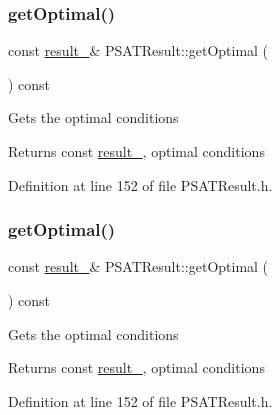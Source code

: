 \subsubsection{\texorpdfstring{get\+Optimal()}{getOptimal()}\hspace{0.1cm}{\footnotesize\ttfamily [1/3]}}
{\footnotesize\ttfamily const \hyperlink{struct_p_s_a_t_result_1_1result__}{result\+\_\+}\& P\+S\+A\+T\+Result\+::get\+Optimal (\begin{DoxyParamCaption}{ }\end{DoxyParamCaption}) const\hspace{0.3cm}{\ttfamily [inline]}}

Gets the optimal conditions

\begin{DoxyReturn}{Returns}
const \hyperlink{struct_p_s_a_t_result_1_1result__}{result\+\_\+}, optimal conditions 
\end{DoxyReturn}


Definition at line 152 of file P\+S\+A\+T\+Result.\+h.

\mbox{\label{class_p_s_a_t_result_af587235430371a05799c60e81aa8dfad}} 
\subsubsection{\texorpdfstring{get\+Optimal()}{getOptimal()}\hspace{0.1cm}{\footnotesize\ttfamily [2/3]}}
{\footnotesize\ttfamily const \hyperlink{struct_p_s_a_t_result_1_1result__}{result\+\_\+}\& P\+S\+A\+T\+Result\+::get\+Optimal (\begin{DoxyParamCaption}{ }\end{DoxyParamCaption}) const\hspace{0.3cm}{\ttfamily [inline]}}

Gets the optimal conditions

\begin{DoxyReturn}{Returns}
const \hyperlink{struct_p_s_a_t_result_1_1result__}{result\+\_\+}, optimal conditions 
\end{DoxyReturn}


Definition at line 152 of file P\+S\+A\+T\+Result.\+h.

\mbox{\label{class_p_s_a_t_result_af587235430371a05799c60e81aa8dfad}} 
